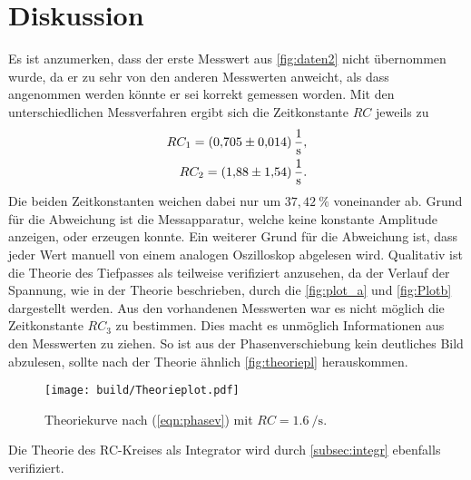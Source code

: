 \section{Diskussion}
\label{sec:Diskussion}

Es ist anzumerken, dass der erste Messwert aus \autoref{fig:daten2} nicht übernommen wurde, da er zu sehr von den anderen Messwerten anweicht,
als dass angenommen werden könnte er sei korrekt gemessen worden.
Mit den unterschiedlichen Messverfahren ergibt sich die Zeitkonstante $RC$ jeweils zu 
\begin{align*}
    RC_1 = \SI{0.705 (0.014)}{\per\second}, \\
    RC_2 = \SI{1.88 (1.54)}{\per\second}. \\
\end{align*}
Die beiden Zeitkonstanten weichen dabei nur um $37,42 \:\%$ voneinander ab.
Grund für die Abweichung ist die Messapparatur, welche keine konstante Amplitude anzeigen, oder erzeugen konnte.
Ein weiterer Grund für die Abweichung ist, dass jeder Wert manuell von einem analogen Oszilloskop abgelesen wird. 
Qualitativ ist die Theorie des Tiefpasses als teilweise verifiziert anzusehen, da der Verlauf der Spannung, wie in der Theorie beschrieben,
durch die \autoref{fig:plot_a} und \autoref{fig:Plotb} dargestellt werden.
Aus den vorhandenen Messwerten war es nicht möglich die Zeitkonstante $RC_3$ zu bestimmen. Dies macht es unmöglich Informationen aus den Messwerten zu ziehen. So ist aus der Phasenverschiebung kein deutliches Bild
abzulesen, sollte nach der Theorie ähnlich \autoref{fig:theoriepl} herauskommen.
\begin{figure}[H]
    \centering
    \texttt{[image: build/Theorieplot.pdf]}
    \caption{Theoriekurve nach (\ref{eqn:phasev}) mit $RC=\SI{1,6}{\per\second}$.}
    \label{fig:theoriepl}
\end{figure}

Die Theorie des RC-Kreises als Integrator wird durch \autoref{subsec:integr} ebenfalls verifiziert.